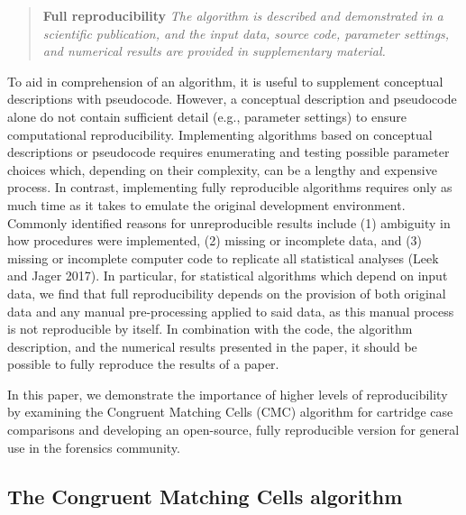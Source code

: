 \begin{quote}
\textbf{Full reproducibility} \emph{The algorithm is described and demonstrated in a scientific publication, and the input data, source code, parameter settings, and numerical results are provided in supplementary material.}
\end{quote}

To aid in comprehension of an algorithm, it is useful to supplement conceptual descriptions with pseudocode.
However, a conceptual description and pseudocode alone do not contain sufficient detail (e.g., parameter settings) to ensure computational reproducibility.
Implementing algorithms based on conceptual descriptions or pseudocode requires enumerating and testing possible parameter choices which, depending on their complexity, can be a lengthy and expensive process.
In contrast, implementing fully reproducible algorithms requires only as much time as it takes to emulate the original development environment.
Commonly identified reasons for unreproducible results include (1) ambiguity in how procedures were implemented, (2) missing or incomplete data, and (3) missing or incomplete computer code to replicate all statistical analyses (Leek and Jager 2017).
In particular, for statistical algorithms which depend on input data, we find that full reproducibility depends on the provision of both original data and any manual pre-processing applied to said data, as this manual process is not reproducible by itself.
In combination with the code, the algorithm description, and the numerical results presented in the paper, it should be possible to fully reproduce the results of a paper.

In this paper, we demonstrate the importance of higher levels of reproducibility by examining the Congruent Matching Cells (CMC) algorithm for cartridge case comparisons and developing an open-source, fully reproducible version for general use in the forensics community.

\hypertarget{the-congruent-matching-cells-algorithm}{%
\subsection{The Congruent Matching Cells algorithm}\label{the-congruent-matching-cells-algorithm}}

